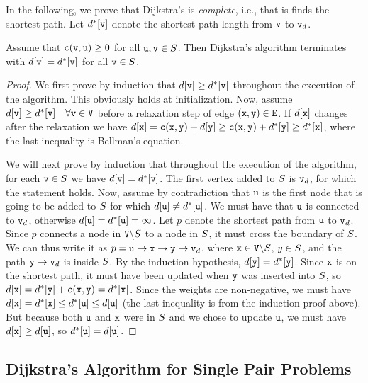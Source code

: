In the following, we prove that Dijkstra's is \textit{complete}, i.e., that is finds the shortest path. Let $d^*[{\tt v}]$ denote the shortest path length from ${\tt v}$ to ${\tt v}_d$.
\begin{theorem}
Assume that ${\tt c}({\tt v},{\tt u})\geq 0$ for all ${\tt u},{\tt v}\in{S}$. Then Dijkstra's algorithm terminates with $d[{\tt v}] = d^*[{\tt v}]$ for all ${\tt v}\in{S}$.
\end{theorem}
\begin{proof}
We first prove by induction that $d[{\tt v}] \geq d^*[{\tt v}]$ throughout the execution of the algorithm. This obviously holds at initialization. Now, assume $d[{\tt v}] \geq d^*[{\tt v}] \quad \forall {\tt v}\in{\tt V}$ before a relaxation step of edge $({\tt x},{\tt y})\in{\tt E}$. If $d[{\tt x}]$ changes after the relaxation we have $d[{\tt x}] = {\tt c}({\tt x},{\tt y}) + d[{\tt y}] \geq {\tt c}({\tt x},{\tt y}) + d^*[{\tt y}] \geq d^*[{\tt x}]$, where the last inequality is Bellman's equation.

We will next prove by induction that throughout the execution of the algorithm, for each ${\tt v} \in {S}$ we have $d[{\tt v}] = d^*[{\tt v}]$.
The first vertex added to ${S}$ is ${\tt v}_d$, for which the statement holds. Now, assume by contradiction that ${\tt u}$ is the first node that is going to be added to ${S}$ for which $d[{\tt u}] \neq d^*[{\tt u}]$. We must have that ${\tt u}$ is connected to ${\tt v}_d$, otherwise $d[{\tt u}] = d^*[{\tt u}] = \infty$. Let $p$ denote the shortest path from ${\tt u}$ to ${\tt v}_d$. Since $p$ connects a node in ${\tt V}\backslash {S}$ to a node in ${S}$, it must cross the boundary of ${S}$. We can thus write it as $p = {\tt u} \to {\tt x} \to {\tt y} \to {\tt v}_d$, where ${\tt x} \in {\tt V}\backslash {S}$, $y \in {S}$, and the path ${\tt y} \to {\tt v}_d$ is inside ${S}$.
By the induction hypothesis, $d[{\tt y}] = d^*[{\tt y}]$. Since ${\tt x}$ is on the shortest path, it must have been updated when ${\tt y}$ was inserted into ${S}$, so $d[{\tt x}] = d^*[{\tt y}] + {\tt c}({\tt x},{\tt y}) = d^*[{\tt x}]$. Since the weights are non-negative, we must have $d[{\tt x}] = d^*[{\tt x}] \leq d^*[{\tt u}] \leq d[{\tt u}]$ (the last inequality is from the induction proof above). But because both ${\tt u}$ and ${\tt x}$ were in ${S}$ and we chose to update ${\tt u}$, we must have $d[{\tt x}] \geq d[{\tt u}]$, so $d^*[{\tt u}] = d[{\tt u}]$.
\end{proof}

\subsection{Dijkstra's Algorithm for Single Pair Problems}

